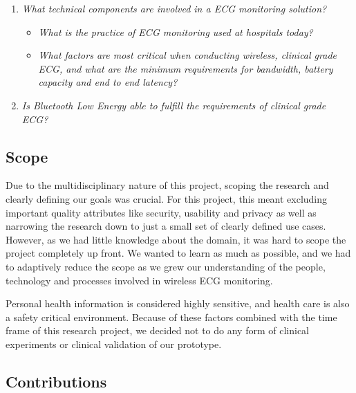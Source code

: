 \label{ssub:research_questions} 
\begin{enumerate}
	
	\item \textit{What technical components are involved in a ECG monitoring solution?} 
	\begin{itemize}
		
		\item \textit{What is the practice of ECG monitoring used at hospitals today?}
		
		\item \textit{What factors are most critical when conducting wireless, clinical grade ECG, and what are the minimum requirements for bandwidth, battery capacity and end to end latency?}
	\end{itemize}
	
	\item \textit{Is Bluetooth Low Energy able to fulfill the requirements of clinical grade ECG?}
\end{enumerate}

\subsection{Scope} 

\label{sub:scope}

Due to the multidisciplinary nature of this project, scoping the research and clearly defining our goals was crucial. For this project, this meant excluding important quality attributes like security, usability and privacy as well as narrowing the research down to just a small set of clearly defined use cases. However, as we had little knowledge about the domain, it was hard to scope the project completely up front. We wanted to learn as much as possible, and we had to adaptively reduce the scope as we grew our understanding of the people, technology and processes involved in wireless ECG monitoring. 

Personal health information is considered highly sensitive, and health care is also a safety critical environment. Because of these factors combined with the time frame of this research project, we decided not to do any form of clinical experiments or clinical validation of our prototype.

\subsection{Contributions}

